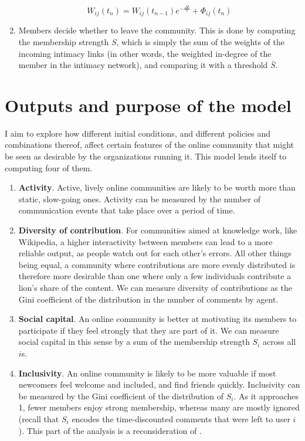 \documentclass{article}
\begin{document}
\begin{enumerate}
\begin{equation}
	W_{ij}(t_n) = W_{ij}(t_{n-1})e^{-\frac{\Delta t}{\tau}} + \Phi_{ij}(t_n)
	\label{eq:updating}
\end{equation}
\item Members decide whether to leave the community. This is done by computing the membership strength $S$, which is simply the sum of the weights of the incoming intimacy links (in other words, the weighted in-degree of the member in the intimacy network), and comparing it with a threshold $\bar{S}$.
\end{enumerate}

\section{Outputs and purpose of the model}\label{section:outputs}

I aim to explore how different initial conditions, and different policies and combinations thereof, affect certain features of the online community that might be seen as desirable by the organizations running it. This model lends itself to computing four of them. 

\begin{enumerate}
\item \textbf{Activity}. Active, lively online communities are likely to be worth more than static, slow-going ones. Activity can be measured by the number of communication events that take place over a period of time.
\item \textbf{Diversity of contribution}. For communities aimed at knowledge work, like Wikipedia, a higher interactivity between members can lead to a more reliable output, as people watch out for each other's errors. All other things being equal, a community where contributions are more evenly distributed is therefore more desirable than one where only a few individuals contribute a lion's share of the content. We can measure diversity of contributions as the Gini coefficient of the distribution in the number of comments by agent.
\item \textbf{Social capital}. An online community is better at motivating its members to participate if they feel strongly that they are part of it. We can measure social capital in this sense by a sum of the membership strength $S_i$ across all $i$s.
\item \textbf{Inclusivity}. An online community is likely to be more valuable if most newcomers feel welcome and included, and find friends quickly. Inclusivity can be measured by the Gini coefficient of the distribution of $S_i$. As it approaches 1, fewer members enjoy strong membership, whereas many are mostly ignored (recall that $S_i$ encodes the time-discounted comments that were left to user $i$). This part of the analysis is a reconsideration of \cite{kim2015group}. 
\end{enumerate}

	
	
\end{document}
